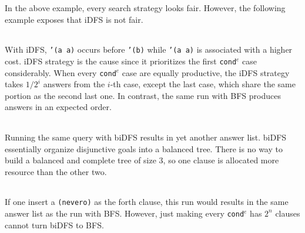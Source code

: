 \documentclass[format=acmlarge, review=true, authordraft=true]{acmart}
\newcommand{\conde}{\texttt{cond$^e$} }
\begin{document}

In the above example, every search strategy looks fair. However, the following 
example exposes that iDFS is not fair.

\begin{center}
  \begin{tabular}{c}
   
   \end{tabular}
\end{center}

With iDFS, \texttt{'(a a)} occurs before \texttt{'(b)} while \texttt{'(a a)} is 
associated with a higher cost. iDFS strategy is the cause since it prioritizes 
the first \conde case considerably. When every \conde case 
are equally productive, the iDFS strategy takes $1/2^{i}$ answers from the 
$i$-th case, except the last case, which share the same portion as the second 
last one. In contrast, the same run with BFS produces answers in an expected 
order.

\begin{center}
  \begin{tabular}{c}
   
   \end{tabular}
\end{center}

Running the same query with biDFS results in yet another answer list. biDFS 
essentially organize disjunctive goals into a balanced tree. There is no way to 
build a balanced and complete tree of size 3, so one clause is allocated more 
resource than the other two.

\begin{center}
	\begin{tabular}{c}
		
	\end{tabular} 
\end{center}

If one insert a \texttt{(nevero)} as the forth clause, this run would results 
in the same answer list as the run with BFS. However, just making every \conde 
has $2^n$ clauses cannot turn biDFS to BFS.

\begin{center}
	\begin{tabular}{c}
		
	\end{tabular}
\end{center}
 
\end{document}
